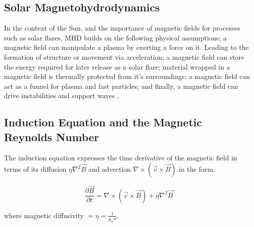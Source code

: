 \appendix
\appendixpage
\addappheadtotoc
%





\subsection{Solar Magnetohydrodynamics}\label{MHD}
In the context of the Sun, and the importance of magnetic fields for processes such as solar flares, MHD builds on the following physical assumptions; a magnetic field can manipulate a plasma by exerting a force on it. Leading to the formation of structure or movement via acceleration; a magnetic field can store the energy required for later release as a solar flare; material wrapped in a magnetic field is thermally protected from it's surroundings; a magnetic field can act as a funnel for plasma and fast particles; and finally, a magnetic field can drive instabilities and support waves \citep{2003dysu.book.....D}.
 
\subsection{Induction Equation and the Magnetic Reynolds Number}
The induction equation expresses the time derivative of the magnetic field in terms of its diffusion $\eta\nabla^{2}\vec{B}$ and advection $\nabla\times(\vec{v}\times\vec{B})$ in the form, 


\begin{equation}\label{induction}
\frac{\partial \vec{B}}{\partial t}=\nabla\times(\vec{v}\times\vec{B})+\eta\nabla^{2}\vec{B}  
\end{equation}

where magnetic diffusivity $=\eta =\frac{1}{\mu_{0}\sigma}$. \\

